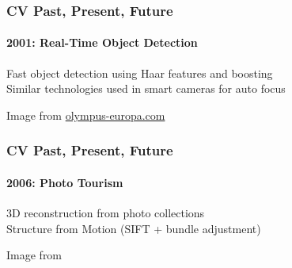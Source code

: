 \documentclass[xetex,professionalfont]{beamer}
\begin{document}

\begin{frame}
\frametitle{CV Past, Present, Future}
\framesubtitle{2001: Real-Time Object Detection}

Fast object detection using Haar features and boosting\\\medskip %
Similar technologies used in smart cameras for auto focus

\bigskip
\begin{center}
    {\centering Image from \url{olympus-europa.com}}
\end{center}

\end{frame}


\begin{frame}
\frametitle{CV Past, Present, Future}
\framesubtitle{2006: Photo Tourism}

3D reconstruction from photo collections\\\medskip
Structure from Motion (SIFT + bundle adjustment) %

\bigskip
\begin{center}
    {\centering Image from \cite{snavely2006}}
\end{center}

\end{frame}
\end{document}

